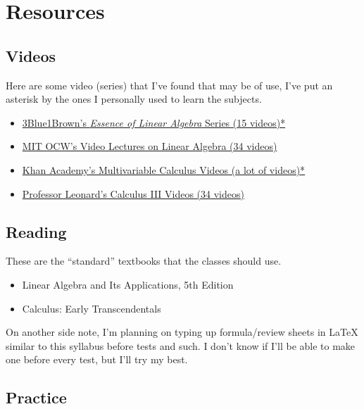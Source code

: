 \documentclass{article}
\begin{document}
\section*{Resources}

\subsection*{Videos}
Here are some video (series) that I've found that may be of use, I've put an asterisk by the 
ones I personally used to learn the subjects.

\begin{itemize}
    \item \href{https://www.youtube.com/watch?v=fNk_zzaMoSs&list=PLZHQObOWTQDPD3MizzM2xVFitgF8hE_ab}%
    {3Blue1Brown's \textit{Essence of Linear Algebra} Series (15 videos)*}
    \item \href{https://ocw.mit.edu/courses/mathematics/18-06-linear-algebra-spring-2010/video-lectures/}{MIT %
    OCW's Video Lectures on Linear Algebra (34 videos)}
    \item \href{https://www.khanacademy.org/math/multivariable-calculus}{Khan Academy's Multivariable Calculus %
    Videos (a lot of videos)*}
    \item \href{https://www.youtube.com/playlist?list=PLDesaqWTN6ESk16YRmzuJ8f6-rnuy0Ry7}{Professor Leonard's %
    Calculus III Videos (34 videos)}
\end{itemize}

\subsection*{Reading}

These are the ``standard'' textbooks that the classes should use.

\begin{itemize}
    \item Linear Algebra and Its Applications, 5th Edition
    \item Calculus: Early Transcendentals
\end{itemize}

On another side note, I'm planning on typing up formula\slash review sheets in \LaTeX{}
similar to this syllabus before tests and such. I don't know if I'll be able to make one
before every test, but I'll try my best.

\subsection*{Practice}
\end{document}
